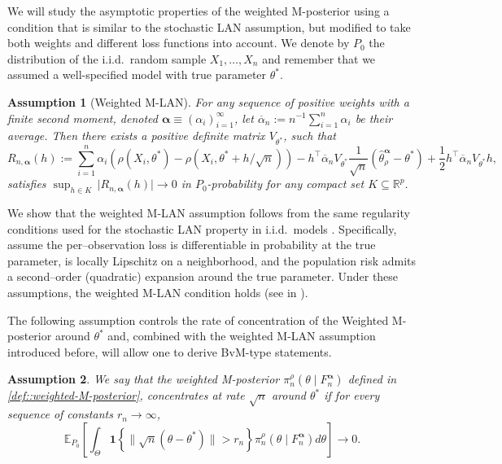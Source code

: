 \documentclass[11pt, oneside]{amsart}
\newtheorem{assumption}{Assumption}
\theoremstyle{definition}   %
\newcommand{\loss}{\rho}
\newcommand{\wempirical}{F_n^{\boldsymbol{\alpha}}}
\newcommand{\mestimator}{\hat{\theta}^{\boldsymbol{\alpha}}_{\loss }}
\begin{document}
We will study the asymptotic properties of the weighted M-posterior using a condition that is similar to the stochastic LAN assumption, but modified to take both weights and different loss functions into account.  We denote by $P_0$ the distribution of the i.i.d.\ random sample $X_1,\dots,X_n$ and remember that we assumed a well-specified model with true parameter $\theta^*$.
%
\begin{assumption}[Weighted M-LAN]
\label{assump::WMLAN}
    For any sequence of positive weights with a finite second moment, denoted \( \boldsymbol{\alpha} \equiv (\alpha_i)_{i = 1}^{\infty}\), let \(\overline{\alpha}_n := n^{-1}\sum_{i=1}^n \alpha_i\) be their average. Then there exists a positive definite matrix \( V_{\theta^*} \), such that
    \begin{equation*}
        R_{n, \mathrm{\boldsymbol{\alpha}}}(h) 
        :=
        \sum_{i=1}^n \alpha_i \left( \loss(X_i, \theta^* ) 
        -
        \loss(X_i, \theta^* + h/\sqrt{n}) \right) - h^\top \overline{\alpha}_n V_{\theta^*} \frac{1}{\sqrt{n}} (\mestimator - \theta^*)
        +
        \frac{1}{2} h^\top \overline{\alpha}_n V_{\theta^*} h,
    \end{equation*}
    satisfies
    $\sup_{h \in K} \, \lvert R_{n, \mathrm{\boldsymbol{\alpha}}}(h) \rvert \rightarrow 0$ in $P_0$-probability for any compact set $K \subseteq \mathbb{R}^p$.
\end{assumption}
%
We show that the weighted M-LAN assumption follows from the same regularity conditions used for the stochastic LAN property in i.i.d.\ models \citep{kleijn:vandervaart2012}. Specifically, assume the per–observation loss is differentiable in probability at the true parameter, is locally Lipschitz on a neighborhood, and the population risk admits a second–order (quadratic) expansion around the true parameter. Under these assumptions, the weighted M-LAN condition holds (see  in ).


The following assumption controls the rate of concentration of the Weighted M-posterior around $\theta^*$ and, combined with the weighted M-LAN assumption introduced before, will allow one to derive BvM-type statements.
%
\begin{assumption}
\label{assump::concentration}
    We say that the weighted M-posterior \( \pi^\loss_{n}(\theta \mid \wempirical) \) defined in \eqref{def::weighted-M-posterior}, concentrates at rate $\sqrt{n}$ around $\theta^*$ if for every sequence of constants $r_n \to \infty$,
    \begin{equation}
    \label{assump:concentration_2}
        \mathbb{E}_{P_0} \left[ \int_\Theta \mathbf{1} \left\{ \|\sqrt{n} (\theta - \theta^*) \| > r_n \right\} \pi^\loss_{n}(\theta \mid \wempirical) d\theta \right] \to 0.
    \end{equation}
\end{assumption}
%
\end{document}
